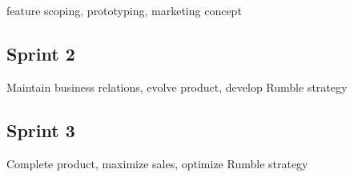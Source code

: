 \documentclass{scrreprt}
\begin{document}
feature scoping, prototyping, marketing concept


\subsection{Sprint 2}
Maintain business relations, evolve product, develop Rumble strategy


\subsection{Sprint 3}
Complete product, maximize sales, optimize Rumble strategy
\end{document}
